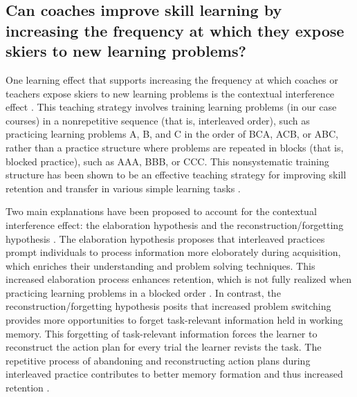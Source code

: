 \subsection{Can coaches improve skill learning by increasing the frequency at which they expose skiers to new learning problems?}
One learning effect that supports increasing the frequency at which coaches or teachers expose skiers to new learning problems is the contextual interference effect \cite{lee_contextual_2012, shea_contextual_1979, magill_review_1990}. This teaching strategy involves training learning problems (in our case courses) in a nonrepetitive sequence (that is, interleaved order), such as practicing learning problems A, B, and C in the order of BCA, ACB, or ABC, rather than a practice structure where problems are repeated in blocks (that is, blocked practice), such as AAA, BBB, or CCC. This nonsystematic training structure has been shown to be an effective teaching strategy for improving skill retention and transfer in various simple learning tasks \cite{tsutsui_contextual_1998, simon_metacognition_2001, shea_context_1983, shea_contextual_1979, tsay_signatures_2023}.

Two main explanations have been proposed to account for the contextual interference effect: the elaboration hypothesis \cite{shea_contextual_1979, shea_context_1983} and the reconstruction/forgetting hypothesis \cite{lee_can_1985, lee_locus_1983}. The elaboration hypothesis proposes that interleaved practices prompt individuals to process information more eloborately during acquisition, which enriches their understanding and problem solving techniques. This increased elaboration process enhances retention, which is not fully realized when practicing learning problems in a blocked order \cite{shea_contextual_1979, shea_context_1983}. In contrast, the reconstruction/forgetting hypothesis posits that increased problem switching provides more opportunities to forget task-relevant information held in working memory. This forgetting of task-relevant information forces the learner to reconstruct the action plan for every trial the learner revists the task. The repetitive process of abandoning and reconstructing action plans during interleaved practice contributes to better memory formation and thus increased retention \cite{lee_can_1985, lee_locus_1983}.

